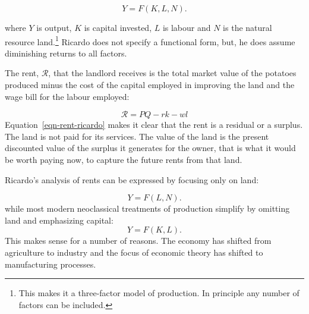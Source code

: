 \begin{equation} 
Y=F(K,L,N).
\label{eqn-production-ricardo}
\end{equation} 

where  $Y$ is output, $K$ is capital invested, $L$ is labour and $N$  is the natural resource land.\footnote{This makes it a three-factor model of production.  In principle any number of factors can be included.}  
Ricardo does not specify a functional form, but, %
he does assume diminishing returns to all factors. 

The  rent, $\mathcal{R}$, that the landlord receives is the total market value of the potatoes produced minus the cost of the capital employed in improving the land and the wage bill for the labour employed: 

\begin{equation} 
\mathcal{R}= PQ-rk-wl
\label{eqn-rent-ricardo}
\end{equation} 
Equation~\ref{eqn-rent-ricardo} makes it clear that the rent is a residual or a \gls{surplus}. The land is not paid for its services. The value of the land is the \gls{present discounted value} of the surplus it generates for the owner, that is what it would be worth paying now, to capture the future rents from that land.

Ricardo's analysis of rents  can be expressed by focusing only on land:

\begin{equation} 
Y=F(L,N).
\label{eqn-production-ricardo-2}
\end{equation} 
while most modern neoclassical treatments of production simplify by omitting land and emphasizing capital:\begin{equation} 
Y=F(K,L).
\label{eqn-production}
\end{equation}  
This makes sense for a number of reasons. The economy has shifted from agriculture to industry and the focus of economic theory has shifted to manufacturing processes.


